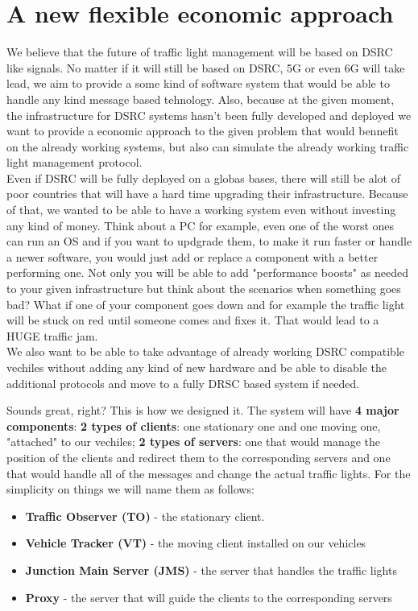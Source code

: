 \documentclass[17pt]{report}
\begin{document}
\pagebreak

\chapter{A new flexible economic approach}
\indent \indent
We believe that the future of traffic light management will be
based on DSRC like signals. No matter if it will still be based 
on DSRC, 5G or even 6G will take lead, we aim to provide a some kind of
software system that would be able to handle any kind message based 
tehnology. Also, because at the given moment, the infrastructure for
DSRC systems hasn't been fully developed and deployed we want to
provide a economic approach to the given problem that would bennefit
on the already working systems, but also can simulate the already
working traffic light management protocol.\\
\indent \indent
Even if DSRC will be fully deployed on a globas bases, there will still be
alot of poor countries that will have a hard time upgrading their infrastructure.
Because of that, we wanted to be able to have a working system even without 
investing any kind of money. Think about a PC for example, even one of the worst
ones can run an OS and if you want to updgrade them, to make it run faster or
handle a newer software, you would just add or replace a component with a better
performing one. Not only you will be able to add "performance boosts" as needed
to your given infrastructure but think about the scenarios when something goes bad?
What if one of your component goes down and for example the traffic light will
be stuck on red until someone comes and fixes it. That would lead to a
HUGE traffic jam.\\
\indent \indent
We also want to be able to take advantage of already working DSRC compatible
vechiles without adding any kind of new hardware  and be able to 
disable the additional protocols and move to a fully DRSC based
system if needed.

Sounds great, right? This is how we designed it. The system will have \textbf{4 major
components}: \textbf{2 types of clients}: one stationary one and one moving one, 
"attached" to our vechiles; \textbf{2 types of servers}: one that would manage the
position of the clients and redirect them to the corresponding servers
and one that would handle all of the messages and change the actual traffic lights.
For the simplicity on things we will name them as follows:
\begin{itemize}
    \item \textbf{Traffic Observer (TO)} - the stationary client.
    \item \textbf{Vehicle Tracker (VT)} - the moving client installed on our vehicles
    \item \textbf{Junction Main Server (JMS)} - the server that handles the traffic lights
    \item \textbf{Proxy} - the server that will guide the clients to the corresponding
    servers
\end{itemize}
\end{document}
